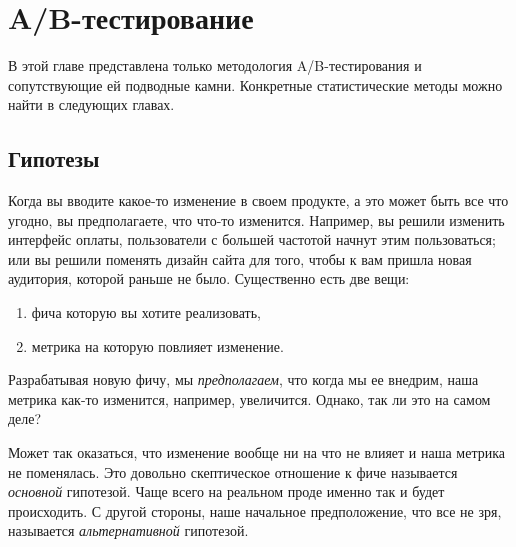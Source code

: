 \documentclass[../handbook.tex]{subfiles}
\begin{document}
\chapter{A\slash B-тестирование}

В этой главе представлена только методология A/B-тестирования и сопутствующие
ей подводные камни. Конкретные статистические методы можно найти в следующих
главах.

\section{Гипотезы}

Когда вы вводите какое-то изменение в своем продукте, а это может быть все что
угодно, вы предполагаете, что что-то изменится. Например, вы решили изменить
интерфейс оплаты, пользователи с большей частотой начнут этим пользоваться; или
вы решили поменять дизайн сайта для того, чтобы к вам пришла новая аудитория,
которой раньше не было. Существенно есть две вещи:
\begin{enumerate}
    \item фича которую вы хотите реализовать,
    \item метрика на которую повлияет изменение.
\end{enumerate}
Разрабатывая новую фичу, мы \emph{предполагаем}, что когда мы ее внедрим, наша
метрика как-то изменится, например, увеличится. Однако, так ли это на самом
деле?

Может так оказаться, что изменение вообще ни на что не влияет и наша метрика не
поменялась. Это довольно скептическое отношение к фиче называется
\emph{основной} гипотезой. Чаще всего на реальном проде именно так и будет
происходить. С другой стороны, наше начальное предположение, что все не зря,
называется \emph{альтернативной} гипотезой.
\end{document}
